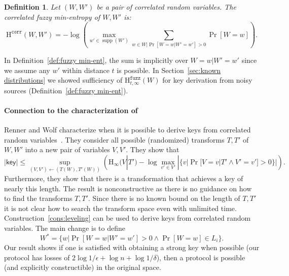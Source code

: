 \documentclass[11pt]{article}
\newcommand{\supp}{\operatorname{supp}}
\newcommand{\secref}[1]{\mbox{Section~\ref{#1}}}
\newcommand{\defref}[1]{\mbox{Definition~\ref{#1}}}
\newcommand{\consref}[1]{\mbox{Construction~\ref{#1}}}
\newcommand{\class}[1]{{\ensuremath{\mathsf{#1}}}}
\newcommand{\key}{\ensuremath{\class{key}}\xspace}
\newcommand{\Hoo}{\mathrm{H}_\infty}
\newcommand{\Hfuzz}{\mathrm{H}^{\mathtt{fuzz}}_{t,\infty}}
\newcommand{\Hcorr}{\mathrm{H}^{\mathtt{corr}}}
\newtheorem{definition}[theorem]{Definition}
\begin{document}
\begin{definition}
\label{def:cor fuzz min}
Let $(W, W')$ be a pair of correlated random variables.  The correlated fuzzy min-entropy of $W, W'$ is:
\[\Hcorr(W, W') = -\log \left( \max_{w'\in \supp(W')}\sum_{w\in W | \Pr[W=w|W'=w']>0} \Pr[W = w] \right).\]
\end{definition}
\noindent 
In \defref{def:fuzzy min-ent}, the sum is implicitly over $W=w|W'=w'$ since we assume any $w'$ within distance $t$ is possible.  
In \secref{sec:known distributions} we showed sufficiency  of $\Hfuzz(W)$ for key derivation from noisy sources (\defref{def:fuzzy min-ent}). 

\paragraph{Connection to the characterization of~\cite{DBLP:conf/asiacrypt/RennerW05}}
Renner and Wolf characterize when it is possible to derive keys from correlated random variables~\cite[Theorem 3]{DBLP:conf/asiacrypt/RennerW05}.  They consider all possible (randomized) transforms $T, T'$ of $W, W'$ into a new pair of variables $V,V'$.  They show that \[|\key| \le \sup_{(V, V')\leftarrow (T(W), T'(W))}\left(  \Hoo(V | T') - \log \max_{v'\in V'} |\{v| \Pr[V=v|T' \wedge V'=v']>0\}|\right).\]  Furthermore, they show that there is a transformation that achieves a key of nearly this length.  The result is nonconstructive as there is no guidance on how to find the transforms $T, T'$.  Since there is no known bound on the length of $T, T'$ it is not clear how to search the transform space even with unlimited time.
\consref{cons:leveling} can be used to derive keys from correlated random variables.  The main change is to define \[W^* = \{w | \Pr[W=w | W'=w'] >0 \wedge \Pr[W=w]\in L_i\}.\]  
Our result shows if one is satisfied with obtaining a strong key when possible (our protocol has losses of $2\log 1/\epsilon + \log n+\log 1/\delta$), then a protocol is possible (and explicitly constructible) in the original space. 
\end{document}
